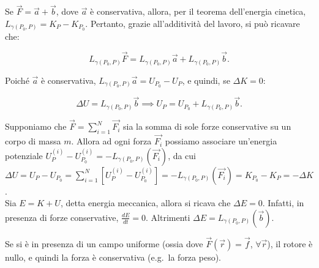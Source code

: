 \documentclass[11pt]{article}
\begin{document}
	\begin{remark}
		Se $\vec{F} = \vec{a} + \vec{b}$, dove $\vec{a}$ è conservativa,
		allora, per il teorema dell'energia cinetica, $L_{\gamma(P_0, P)} =
		K_P - K_{P_0}$. Pertanto, grazie all'additività del lavoro,
		si può ricavare che:
		
		\[ L_{\gamma(P_0, P)} \vec{F} = L_{\gamma(P_0, P)} \vec{a} + L_{\gamma(P_0, P)} \vec{b}. \]
		
		Poiché $\vec{a}$ è conservativa, $L_{\gamma(P_0, P)} \vec{a} = U_{P_0} - U_P$, e quindi, se $\Delta K = 0$:
		
		\[ \Delta U =  L_{\gamma(P_0, P)} \vec{b} \implies U_P = U_{P_0} + L_{\gamma(P_0, P)} \vec{b}. \]
	\end{remark}

	Supponiamo che $\vec{F} = \sum_{i=1}^N \vec{F_i}$ sia la
	somma di sole forze conservative su un corpo di massa $m$.
	Allora ad ogni forza $\vec{F_i}$ possiamo associare un'energia
	potenziale $U_P^{(i)} - U_{P_0}^{(i)} = - L_{\gamma(P_0, P)} (\vec{F_i})$,
	da cui $\Delta U = U_P - U_{P_0} = \sum_{i=1}^N \left[U_P^{(i)} - U_{P_0}^{(i)}\right] = -L_{\gamma(P_0, P)} (\vec{F_i}) = K_{P_0} - K_P = -\Delta K$. \\
	
	Sia $E = K + U$, detta energia meccanica, allora si ricava che $\Delta E = 0$. Infatti, in presenza di forze conservative, $\frac{dE}{dt} = 0$.
	Altrimenti $\Delta E = L_{\gamma(P_0, P)} (\vec{b})$.

	\begin{example}
		Se si è in presenza di un campo uniforme (ossia dove $\vec{F}(\vec{r}) = \vec{f}$, $\forall \vec{r}$), il rotore è nullo, e quindi la
		forza è conservativa (e.g.~la forza peso).
	\end{example}
\end{document}
